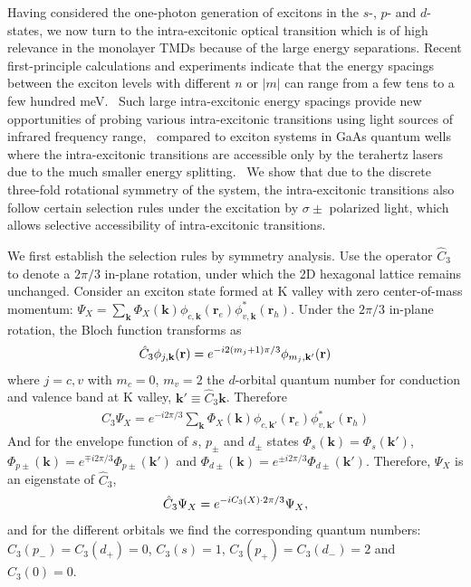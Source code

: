 \documentclass[prb,twocolumn,amsmath,amssymb,superscriptaddress,showpacs]{revtex4}
\begin{document}
Having considered the one-photon generation of excitons in the $s$-, $p$- and $d$- states, we now turn to the intra-excitonic optical transition which is of high relevance in the monolayer TMDs because of the large energy separations. Recent first-principle calculations and experiments indicate that the energy spacings between the exciton levels with different $n$ or $|m|$ can range from a few tens to a few hundred meV.~\cite{S. Louie MoS2 specturm calculation PRL2013, X Zhang S Louie TPA 2014} Such large intra-excitonic energy spacings provide new opportunities of probing various intra-excitonic transitions using light sources of infrared frequency range,~\cite{Exciton 1s-2p TMDs nmat2015}
compared to exciton systems in GaAs quantum wells where the intra-excitonic transitions are accessible only by the terahertz lasers due to the much smaller energy splitting.~\cite{Chemla Ultrafast terahertz probes 2003, Broadband THz study of excitonic resonances 2005, Stimulated Terahertz Emission 2006, Transient terahertz spectroscopy of excitons 2009} We show that due to the discrete three-fold rotational symmetry of the system, the intra-excitonic transitions also follow certain selection rules under the excitation by $\sigma \pm$ polarized light, which allows selective accessibility of intra-excitonic transitions.

We first establish the selection rules by symmetry analysis. Use the operator $\hat{C}_{3}$ to denote a $2\pi/3$ in-plane rotation, under which the 2D hexagonal lattice remains unchanged. Consider an exciton state formed at K valley with zero center-of-mass momentum: $\Psi_{X}=\sum_{\mathbf{k}}\Phi_{X}(\mathbf{k})\phi_{c,\mathbf{k}}
(\mathbf{r}_{e})\phi_{v,\mathbf{k}}^{*}(\mathbf{r}_{h})$. Under the $2\pi/3$ in-plane rotation, the Bloch function transforms as
\begin{align}
\hat{C}_{3}\phi_{{j},\mathbf{k}}(\mathbf{r})=e^{-i2(m_{j}+1)\pi/3}\phi_{m_{j},\mathbf{k'}}(\mathbf{r})  \notag
\end{align}
where $j=c, v$ with $m_{c}=0$, $m_{v}=2$ the $d$-orbital quantum number for conduction and valence band at K valley, $\mathbf{k'} \equiv \hat{C}_{3} \mathbf{k}$.
Therefore
\begin{align}
\hat{C}_{3}\Psi_{X}=e^{-i2\pi/3}\sum_{\mathbf{k}}\Phi_{X}(\mathbf{k}) \phi_{c,\mathbf{k'}}(\mathbf{r}_{e})\phi_{v,\mathbf{k'}}^{*} (\mathbf{r}_{h})
\end{align}
And for the envelope function of $s$, $p_{\pm}$ and $d_{\pm}$ states $\Phi_{s}(\mathbf{k})=\Phi_{s}(\mathbf{k}')$, $\Phi_{p\pm}(\mathbf{k})=e^{\mp i2\pi/3}\Phi_{p\pm}(\mathbf{k}')$ and $\Phi_{d\pm}(\mathbf{k})=e^{\pm i2\pi/3}\Phi_{d\pm}(\mathbf{k}')$. Therefore, $\Psi_{X}$ is an eigenstate of $\hat{C}_{3}$,
\begin{align}
\hat{C}_{3}\Psi_{X}=e^{-iC_{3}(X)\cdot2\pi/3}\Psi_{X}, \notag
\end{align}
and for the different orbitals we find the corresponding quantum numbers: $C_{3}(p_{-})=C_{3}(d_{+})=0$, $C_{3}(s)=1$, $C_{3}(p_{+})=C_{3}(d_{-})=2$ and $C_{3}(0)=0$.
\end{document}
